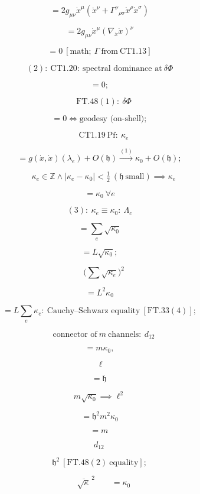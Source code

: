 \begin{theorem}
\[
= 2g_{\mu\nu}\dot x^\mu(\ddot x^\nu+\Gamma^\nu{}_{\rho\sigma}\dot x^\rho\dot x^\sigma)
\]

\[
= 2g_{\mu\nu}\dot x^\mu(\nabla_{\dot x}\dot x)^\nu
\]

\[
= 0\ [\text{math};\ \Gamma\ \text{from}\ \mathrm{CT1.13}]
\]

\[
(2):\ \mathrm{CT1.20}:\ \text{spectral dominance at}\ \delta\Phi
\]

\[
= 0;
\]

\[
\quad\mathrm{FT.48}(1):\ \delta\Phi
\]

\[
= 0\iff\text{geodesy (on-shell)};
\]

\[
\quad\mathrm{CT1.19}\ \text{Pf}:\ \kappa_e
\]

\[
= g(\dot x,\dot x)(\lambda_e)+O(\mathfrak h)\xrightarrow{(1)}\kappa_0+O(\mathfrak h);
\]

\[
\quad\kappa_e\in\mathbb Z\wedge|\kappa_e-\kappa_0|<\tfrac12\ (\mathfrak h\ \text{small})\implies\kappa_e
\]

\[
= \kappa_0\ \forall e
\]

\[
(3):\ \kappa_e\equiv\kappa_0:\ \Lambda_c
\]

\[
= \textstyle\sum_e\sqrt{\kappa_0}
\]

\[
= L\sqrt{\kappa_0};
\]

\[
\quad\bigl(\textstyle\sum\sqrt{\kappa_e}\bigr)^2
\]

\[
= L^2\kappa_0
\]

\[
= L\sum_e\kappa_e:\ \text{Cauchy–Schwarz equality}\ [\mathrm{FT.33}(4)];
\]

\[
\quad\text{connector of}\ m\ \text{channels}:\ d_{12}
\]

\[
= m\kappa_0,
\]

\[
\ \ell
\]

\[
= \mathfrak h\,
\]

\[
m\sqrt{\kappa_0}\implies\ell^2
\]

\[
= \mathfrak h^2m^2\kappa_0
\]

\[
= m\,
\]

\[
d_{12}\,
\]

\[
\mathfrak h^2\ [\mathrm{FT.48}(2)\ \text{equality}];
\]

\[
\quad\overline{\sqrt\kappa}^{\,2}\qquad = \kappa_0
\]


\end{theorem}
